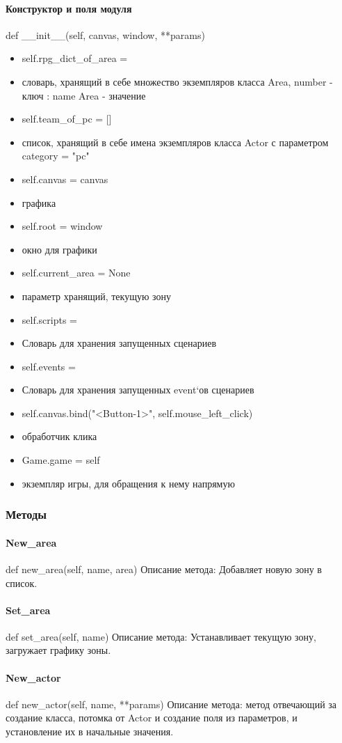 \paragraph{Конструктор и поля модуля}
def \_\_init\_\_(self,  canvas, window, **params) 
\begin{itemize} 
	\item self.rpg\_dict\_of\_area = {} 
	\item словарь, хранящий в себе множество экземпляров класса Area, {number - ключ : name Area - значение}
	\item self.team\_of\_pc = [] 
	\item список, хранящий в себе имена экземпляров класса Actor с параметром category = "pc"
	\item self.canvas = canvas 
	\item графика
	\item self.root = window 
	\item окно для графики
	\item self.current\_area = None 
	\item параметр хранящий, текущую зону
	\item self.scripts = {}  
	\item Словарь для хранения запущенных сценариев
	\item self.events = {} 
	\item Словарь для хранения запущенных event`ов сценариев
	\item self.canvas.bind("<Button-1>", self.mouse\_left\_click)
	\item обработчик клика
	\item Game.game = self
	\item экземпляр игры, для обращения к нему напрямую
\end{itemize}
\subsubsection{Методы}
\paragraph{New\_area}
def new\_area(self, name, area)
Описание метода: Добавляет новую зону в список.
\paragraph{Set\_area}
def set\_area(self, name)
Описание метода: Устанавливает текущую зону, загружает графику зоны.
\paragraph{New\_actor}
def new\_actor(self, name, **params)
Описание метода: метод отвечающий за создание класса, потомка от Actor и создание поля из параметров, и установление их в начальные значения.
